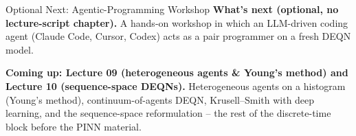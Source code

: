 \documentclass[aspectratio=169,11pt]{beamer}
\begin{document}
\begin{frame}{Optional Next: Agentic-Programming Workshop}
\footnotesize
\textbf{What's next (optional, no lecture-script chapter).}  A hands-on workshop in which an LLM-driven coding agent (Claude Code, Cursor, Codex) acts as a pair programmer on a fresh DEQN model.

\vspace{0.4em}
\textbf{Coming up: Lecture 09 (heterogeneous agents \& Young's method) and Lecture 10 (sequence-space DEQNs).}  Heterogeneous agents on a histogram (Young's method), continuum-of-agents DEQN, Krusell--Smith with deep learning, and the sequence-space reformulation -- the rest of the discrete-time block before the PINN material.
\end{frame}
\end{document}
